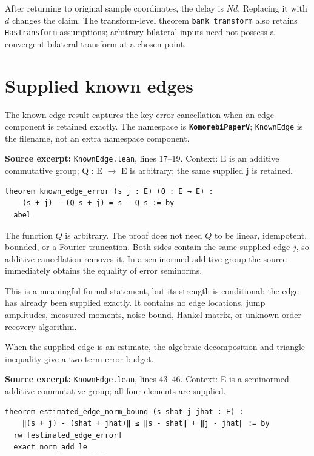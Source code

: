 \documentclass[11pt]{article}
\begin{document}
After returning to original sample coordinates, the delay is \(Nd\). Replacing it with \(d\) changes the claim. The transform-level theorem \texttt{bank\_transform} also retains \texttt{HasTransform} assumptions; arbitrary bilateral inputs need not possess a convergent bilateral transform at a chosen point.

\hypertarget{supplied-known-edges}{%
\section{Supplied known edges}\label{supplied-known-edges}}

The known-edge result captures the key error cancellation when an edge component is retained exactly. The namespace is \textbf{\texttt{KomorebiPaperV}}; \texttt{KnownEdge} is the filename, not an extra namespace component.

\textbf{Source excerpt:} \texttt{KnownEdge.lean}, lines 17--19. Context: E is an additive commutative group; Q : E \ensuremath{\to} E is arbitrary; the same supplied j is retained.

\begin{minipage}{\linewidth}
\begin{lstlisting}
theorem known_edge_error (s j : E) (Q : E → E) :
    (s + j) - (Q s + j) = s - Q s := by
  abel
\end{lstlisting}
\end{minipage}\par

The function \(Q\) is arbitrary. The proof does not need \(Q\) to be linear, idempotent, bounded, or a Fourier truncation. Both sides contain the same supplied edge \(j\), so additive cancellation removes it. In a seminormed additive group the source immediately obtains the equality of error seminorms.

This is a meaningful formal statement, but its strength is conditional: the edge has already been supplied exactly. It contains no edge locations, jump amplitudes, measured moments, noise bound, Hankel matrix, or unknown-order recovery algorithm.

When the supplied edge is an estimate, the algebraic decomposition and triangle inequality give a two-term error budget.

\textbf{Source excerpt:} \texttt{KnownEdge.lean}, lines 43--46. Context: E is a seminormed additive commutative group; all four elements are supplied.

\begin{minipage}{\linewidth}
\begin{lstlisting}
theorem estimated_edge_norm_bound (s shat j jhat : E) :
    ‖(s + j) - (shat + jhat)‖ ≤ ‖s - shat‖ + ‖j - jhat‖ := by
  rw [estimated_edge_error]
  exact norm_add_le _ _
\end{lstlisting}
\end{minipage}\par
\end{document}
